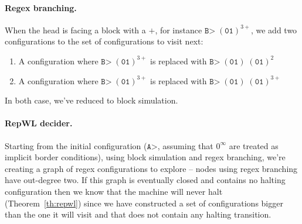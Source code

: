 \paragraph{Regex branching.} When the head is facing a block with a $+$, for instance $\texttt{B>} \; (\texttt{01})^{3+}$, we add two configurations to the set of configurations to visit next:
\begin{enumerate}
    \item A configuration where $\texttt{B>} \; (\texttt{01})^{3+}$ is replaced with $\texttt{B>} \; (\texttt{01}) \; (\texttt{01})^{2}$
    \item A configuration where $\texttt{B>} \; (\texttt{01})^{3+}$ is replaced with  $\texttt{B>} \; (\texttt{01}) \; (\texttt{01})^{3+}$
\end{enumerate}
In both case, we've reduced to block simulation.

\paragraph{RepWL decider.} Starting from the initial configuration (\ie $\texttt{A>}$, assuming that $0^\infty$ are treated as implicit border conditions), using block simulation and regex branching, we're creating a graph of regex configurations to explore -- nodes using regex branching have out-degree two. If this graph is eventually closed and contains no halting configuration then we know that the machine will never halt (Theorem~\ref{th:repwl}) since we have constructed a set of configurations bigger than the one it will visit and that does not contain any halting transition.
